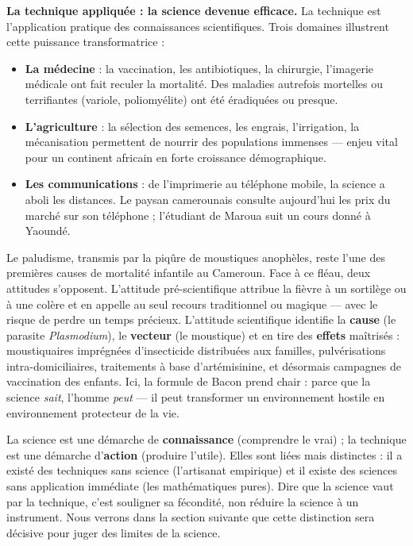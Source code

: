 \documentclass[11pt]{article}
\newcommand{\cle}[1]{{\popxbold\color{popdark}#1}}
\begin{document}
\textbf{La technique appliquée : la science devenue efficace.} La \cle{technique} est l'application pratique des connaissances scientifiques. Trois domaines illustrent cette puissance transformatrice :

\begin{itemize}
\item \textbf{La médecine} : la vaccination, les antibiotiques, la chirurgie, l'imagerie médicale ont fait reculer la mortalité. Des maladies autrefois mortelles ou terrifiantes (variole, poliomyélite) ont été éradiquées ou presque.
\item \textbf{L'agriculture} : la sélection des semences, les engrais, l'irrigation, la mécanisation permettent de nourrir des populations immenses — enjeu vital pour un continent africain en forte croissance démographique.
\item \textbf{Les communications} : de l'imprimerie au téléphone mobile, la science a aboli les distances. Le paysan camerounais consulte aujourd'hui les prix du marché sur son téléphone ; l'étudiant de Maroua suit un cours donné à Yaoundé.
\end{itemize}

\begin{exemplebox}
Le paludisme, transmis par la piqûre de moustiques anophèles, reste l'une des premières causes de mortalité infantile au Cameroun. Face à ce fléau, deux attitudes s'opposent. L'attitude pré-scientifique attribue la fièvre à un sortilège ou à une colère et en appelle au seul recours traditionnel ou magique — avec le risque de perdre un temps précieux. L'attitude scientifique identifie la \textbf{cause} (le parasite \emph{Plasmodium}), le \textbf{vecteur} (le moustique) et en tire des \textbf{effets} maîtrisés : moustiquaires imprégnées d'insecticide distribuées aux familles, pulvérisations intra-domiciliaires, traitements à base d'artémisinine, et désormais campagnes de vaccination des enfants. Ici, la formule de Bacon prend chair : parce que la science \emph{sait}, l'homme \emph{peut} — il peut transformer un environnement hostile en environnement protecteur de la vie.
\end{exemplebox}

\begin{attention}
La \cle{science} est une démarche de \textbf{connaissance} (comprendre le vrai) ; la \cle{technique} est une démarche d'\textbf{action} (produire l'utile). Elles sont liées mais distinctes : il a existé des techniques sans science (l'artisanat empirique) et il existe des sciences sans application immédiate (les mathématiques pures). Dire que la science vaut par la technique, c'est souligner sa fécondité, non réduire la science à un instrument. Nous verrons dans la section suivante que cette distinction sera décisive pour juger des limites de la science.
\end{attention}
\end{document}
